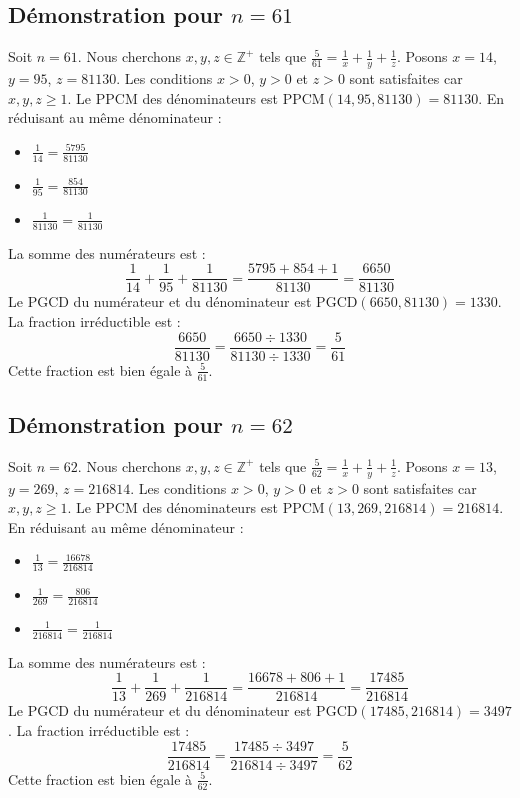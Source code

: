 \documentclass[11pt,a4paper]{article}
\begin{document}
\subsection{Démonstration pour $n = 61$}
Soit $n = 61$. Nous cherchons $x, y, z \in \mathbb{Z}^{+}$ tels que $\frac{5}{61} = \frac{1}{x} + \frac{1}{y} + \frac{1}{z}$.
Posons $x = 14$, $y = 95$, $z = 81130$.
Les conditions $x > 0$, $y > 0$ et $z > 0$ sont satisfaites car $x, y, z \geq 1$.
Le PPCM des dénominateurs est $\text{PPCM}(14, 95, 81130) = 81130$.
En réduisant au même dénominateur :
\begin{itemize}
    \item $\frac{1}{14} = \frac{5795}{81130}$
    \item $\frac{1}{95} = \frac{854}{81130}$
    \item $\frac{1}{81130} = \frac{1}{81130}$
\end{itemize}
La somme des numérateurs est :
$$ \frac{1}{14} + \frac{1}{95} + \frac{1}{81130} = \frac{5795 + 854 + 1}{81130} = \frac{6650}{81130} $$
Le PGCD du numérateur et du dénominateur est $\text{PGCD}(6650, 81130) = 1330$.
La fraction irréductible est :
$$ \frac{6650}{81130} = \frac{6650 \div 1330}{81130 \div 1330} = \frac{5}{61} $$
Cette fraction est bien égale à $\frac{5}{61}$.

\subsection{Démonstration pour $n = 62$}
Soit $n = 62$. Nous cherchons $x, y, z \in \mathbb{Z}^{+}$ tels que $\frac{5}{62} = \frac{1}{x} + \frac{1}{y} + \frac{1}{z}$.
Posons $x = 13$, $y = 269$, $z = 216814$.
Les conditions $x > 0$, $y > 0$ et $z > 0$ sont satisfaites car $x, y, z \geq 1$.
Le PPCM des dénominateurs est $\text{PPCM}(13, 269, 216814) = 216814$.
En réduisant au même dénominateur :
\begin{itemize}
    \item $\frac{1}{13} = \frac{16678}{216814}$
    \item $\frac{1}{269} = \frac{806}{216814}$
    \item $\frac{1}{216814} = \frac{1}{216814}$
\end{itemize}
La somme des numérateurs est :
$$ \frac{1}{13} + \frac{1}{269} + \frac{1}{216814} = \frac{16678 + 806 + 1}{216814} = \frac{17485}{216814} $$
Le PGCD du numérateur et du dénominateur est $\text{PGCD}(17485, 216814) = 3497$.
La fraction irréductible est :
$$ \frac{17485}{216814} = \frac{17485 \div 3497}{216814 \div 3497} = \frac{5}{62} $$
Cette fraction est bien égale à $\frac{5}{62}$.
\end{document}
